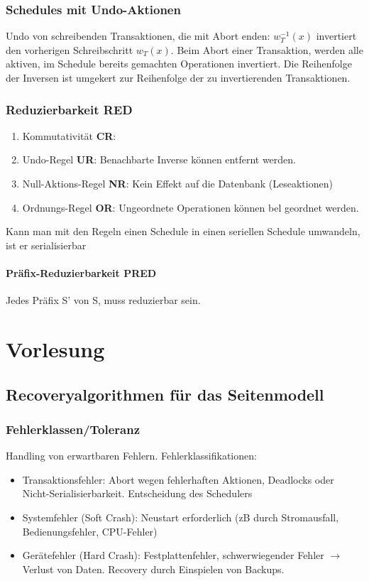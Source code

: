 \documentclass[ngerman]{scrartcl}
\begin{document}
\subsubsection{Schedules mit Undo-Aktionen}
Undo von schreibenden Transaktionen, die mit Abort enden: $ w_T ^{-1} (x) $ invertiert den vorherigen Schreibschritt $ w_T(x) $. Beim Abort einer Transaktion, werden alle aktiven, im Schedule bereits gemachten Operationen invertiert. Die Reihenfolge der Inversen ist umgekert zur Reihenfolge der zu invertierenden Transaktionen.

\subsubsection{Reduzierbarkeit RED}  
\begin{enumerate}
  \item Kommutativität \textbf{CR}:
  \item Undo-Regel \textbf{UR}: Benachbarte Inverse können entfernt werden.
  \item Null-Aktions-Regel \textbf{NR}: Kein Effekt auf die Datenbank (Leseaktionen)
  \item Ordnungs-Regel \textbf{OR}: Ungeordnete Operationen können bel geordnet werden.
\end{enumerate}
Kann man mit den Regeln einen Schedule in einen seriellen Schedule umwandeln, ist er serialisierbar

\paragraph{Präfix-Reduzierbarkeit PRED} Jedes Präfix S' von S, muss reduzierbar sein.

 
\section{Vorlesung}
\subsection{Recoveryalgorithmen für das Seitenmodell}

\subsubsection{Fehlerklassen/Toleranz}
Handling von erwartbaren Fehlern. Fehlerklassifikationen:
\begin{itemize}
  \item Transaktionsfehler: Abort wegen fehlerhaften Aktionen, Deadlocks oder Nicht-Serialisierbarkeit. Entscheidung des Schedulers
  \item Systemfehler (Soft Crash): Neustart erforderlich (zB durch Stromausfall, Bedienungsfehler, CPU-Fehler)
  \item Gerätefehler (Hard Crash): Festplattenfehler, schwerwiegender Fehler $ \rightarrow $ Verlust von Daten. Recovery durch Einspielen von Backups.
\end{itemize}
\end{document}
